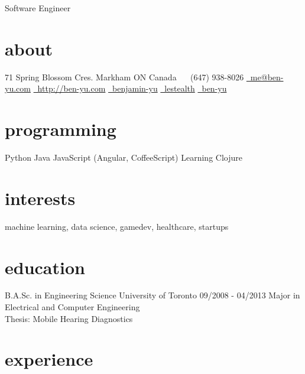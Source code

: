 \documentclass[]{friggeri-cv}
\begin{document}
       {Software Engineer}


\begin{aside}
  \section{about}
    71 Spring Blossom Cres.
    Markham ON
    Canada
    ~
    \symbolfont\faPhone\bodyfont\ (647) 938-8026
    \href{mailto:me@ben-yu.com}{\symbolfont\faEnvelope\bodyfont\ me@ben-yu.com}
    \href{http://ben-yu.com}{\symbolfont\faGlobe \bodyfont\ http://ben-yu.com}
    \href{http://www.linkedin.com/pub/benjamin-yu/20/9b0/153}{\symbolfont{\faLinkedin} \bodyfont\ benjamin-yu}
    \href{http://twitter.com/_ben_yu}{\symbolfont\faTwitter \bodyfont\ lestealth}
    \href{https://github.com/ben-yu}{\symbolfont{\faGithub} \bodyfont\ ben-yu}
  \section{programming}
    Python
    Java
    JavaScript
    (Angular, CoffeeScript)
    Learning Clojure
\end{aside}

\section{interests}

machine learning, data science, gamedev, healthcare, startups

\section{education}

\begin{entrylist}
  \entry
    {B.A.Sc. in Engineering Science}
    {University of Toronto}
    {09/2008 - 04/2013}
    {Major in Electrical and Computer Engineering \\
     Thesis: Mobile Hearing Diagnostics}

\end{entrylist}

\section{experience}
\end{document}
